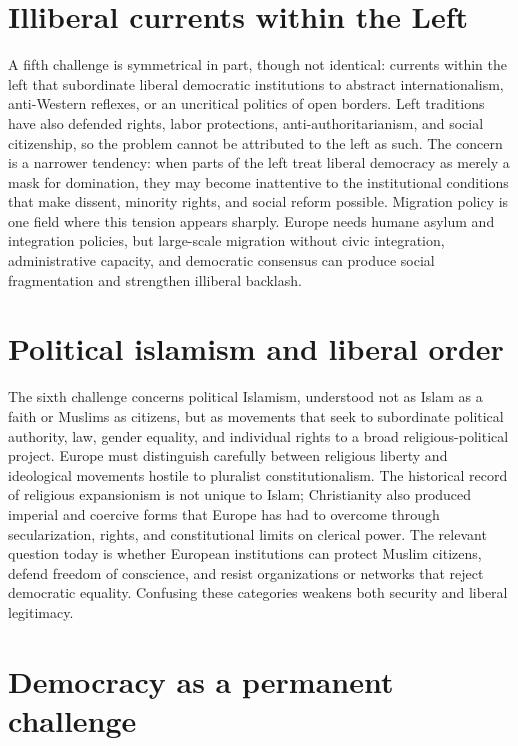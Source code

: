 \documentclass[11pt]{article}
\begin{document}
\section{Illiberal currents within the Left}

A fifth challenge is symmetrical in part, though not identical: currents within the left that subordinate liberal democratic institutions to abstract internationalism, anti-Western reflexes, or an uncritical politics of open borders. Left traditions have also defended rights, labor protections, anti-authoritarianism, and social citizenship, so the problem cannot be attributed to the left as such. The concern is a narrower tendency: when parts of the left treat liberal democracy as merely a mask for domination, they may become inattentive to the institutional conditions that make dissent, minority rights, and social reform possible. Migration policy is one field where this tension appears sharply. Europe needs humane asylum and integration policies, but large-scale migration without civic integration, administrative capacity, and democratic consensus can produce social fragmentation and strengthen illiberal backlash.

\section{Political islamism and liberal order}

The sixth challenge concerns political Islamism, understood not as Islam as a faith or Muslims as citizens, but as movements that seek to subordinate political authority, law, gender equality, and individual rights to a broad religious-political project. Europe must distinguish carefully between religious liberty and ideological movements hostile to pluralist constitutionalism. The historical record of religious expansionism is not unique to Islam; Christianity also produced imperial and coercive forms that Europe has had to overcome through secularization, rights, and constitutional limits on clerical power. The relevant question today is whether European institutions can protect Muslim citizens, defend freedom of conscience, and resist organizations or networks that reject democratic equality. Confusing these categories weakens both security and liberal legitimacy.

\section{Democracy as a permanent challenge}
\end{document}
